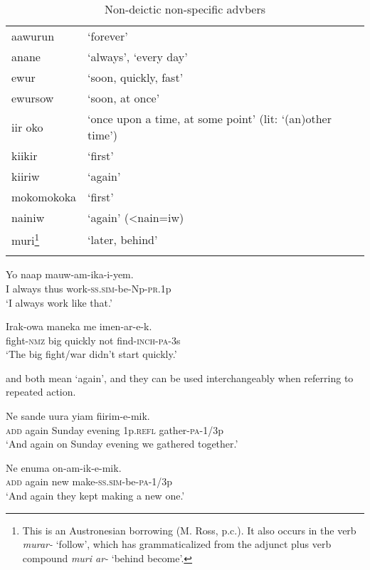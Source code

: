 \begin{table}
\begin{tabular}{ll}
\mytoprule
aawurun &`forever'\\
anane &`always', `every day'\\
ewur &`soon, quickly, fast'\\
ewursow &`soon, at once'\\
iir oko &`once upon a time, at some point' (lit: `(an)other time')\\
kiikir &`first'\\
kiiriw &`again'\\
mokomokoka &`first'\\
nainiw &`again' ({{\textless}}nain=iw)\\
muri\footnote{This is an Austronesian borrowing (M. Ross, p.c.). It also occurs in the verb \textit{murar-} `follow', which has grammaticalized from the adjunct plus verb compound \textit{muri ar-} `behind become'.} &`later, behind'\\
\mybottomrule
\end{tabular}
\caption{Non-deictic non-specific advbers}
\label{tab:3:nondeicticnonspecific}
\end{table}

\ea%
\label{ex:x502}
\gll Yo  naap mauw-am-ika-i-yem. \\
I always thus work-\textsc{ss}.\textsc{sim}-be-Np-\textsc{pr}.1p\\
\glt`I always work like that.'
\z

\ea%
\label{ex:x504}
\gll Irak-owa maneka  me imen-ar-e-k. \\
fight-\textsc{nmz} big quickly not find-\textsc{inch}-\textsc{pa}-3s\\
\glt`The big fight/war didn't start quickly.'
\z

 and  both mean `again', and they can be used interchangeably when referring to repeated action.

\ea%
\label{ex:x697}
\gll Ne  sande uura yiam fiirim-e-mik. \\
\textsc{add} again Sunday evening 1p.\textsc{refl} gather-\textsc{pa}-1/3p\\
\glt`And again on Sunday evening we gathered together.'
\z

\ea%
\label{ex:x1762}
\gll Ne  enuma on-am-ik-e-mik. \\
\textsc{add} again new make-\textsc{ss}.\textsc{sim}-be-\textsc{pa}-1/3p\\
\glt`And again they kept making a new one.'
\z

